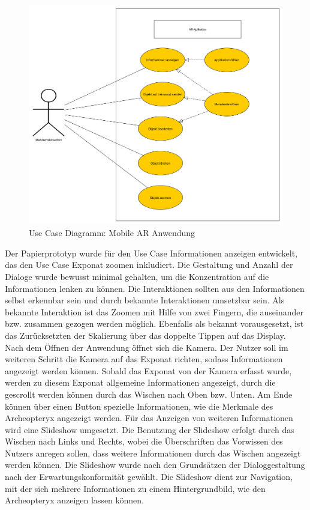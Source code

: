 \documentclass[runningheads,a4paper]{llncs}
\begin{document}
\begin{figure}[H]
	\centering
	\includegraphics[scale=0.15]{use_c_museum}
	\caption{Use Case Diagramm: Mobile AR Anwendung}
	\label{pict:use_case}
\end{figure} 

Der Papierprototyp wurde für den Use Case Informationen anzeigen entwickelt, das den Use Case Exponat zoomen inkludiert. Die Gestaltung und Anzahl der Dialoge wurde bewusst minimal gehalten, um die Konzentration auf die Informationen lenken zu können. Die Interaktionen sollten aus den Informationen selbst erkennbar sein und durch bekannte Interaktionen umsetzbar sein. Als bekannte Interaktion ist das Zoomen mit Hilfe von zwei Fingern, die auseinander bzw. zusammen gezogen werden möglich. Ebenfalls als bekannt vorausgesetzt, ist das Zurücksetzten der Skalierung über das doppelte Tippen auf das Display. Nach dem Öffnen der Anwendung öffnet sich die Kamera. Der Nutzer soll im weiteren Schritt die Kamera auf das Exponat richten, sodass Informationen angezeigt werden können. Sobald das Exponat von der Kamera erfasst wurde, werden zu diesem Exponat allgemeine Informationen angezeigt, durch die gescrollt werden können durch das Wischen nach Oben bzw. Unten. Am Ende können über einen Button spezielle Informationen, wie die Merkmale des Archeopteryx angezeigt werden.
Für das Anzeigen von weiteren Informationen wird eine Slideshow umgesetzt. Die Benutzung der Slideshow erfolgt durch das Wischen nach Links und Rechts, wobei die Überschriften das Vorwissen des Nutzers anregen sollen, dass weitere Informationen durch das Wischen angezeigt werden können. Die Slideshow wurde nach den Grundsätzen der Dialoggestaltung nach der Erwartungskonformität gewählt. Die Slideshow dient zur Navigation, mit der sich mehrere Informationen zu einem Hintergrundbild, wie den Archeopteryx anzeigen lassen können.\\
\end{document}
